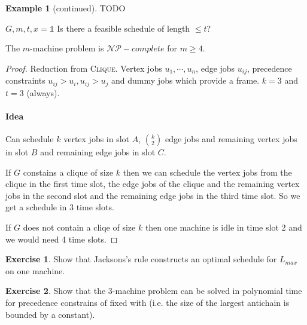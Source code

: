 \documentclass[11pt,a4paper,notitlepage]{article}
\providecommand{\NP}{\mathcal{NP}}
\theoremstyle{plain}
\theoremstyle{definition}
\newtheorem{example}[defn]{Example}
\newtheorem{exercise}{Exercise}
\begin{document}
\begin{example}[continued]
  TODO
\end{example}

\begin{problem}
  \quad
  \begin{algorithmic}
    \REQUIRE $G,m,t,x=\mathds{1}$
    \ENSURE Is there a feasible schedule of length $\leq t$?
  \end{algorithmic}
\end{problem}

\begin{theorem}
  The $m$-machine problem is $\NP-complete$ for $m\geq 4$.
\end{theorem}

\begin{proof}
  Reduction from \textsc{Clique}. Vertex jobs $u_{1},\cdots,u_{n}$, edge jobs
  $u_{ij}$, precedence constraints $u_{ij}>u_{i}, u_{ij}>u_{j}$ and dummy jobs
  which provide a frame. $k=3$ and $t=3$ (always).

  \paragraph{Idea} Can schedule $k$ vertex jobs in slot $A$, $k\choose 2$ edge
  jobs and remaining vertex jobs in slot $B$ and remaining edge jobs in slot
  $C$.


  If $G$ constains a clique of size $k$ then we can schedule the vertex jobs
  from the clique in the first time slot, the edge jobs of the clique and the
  remaining vertex jobs in the second slot and the remaining edge jobs in the
  third time slot. So we get a schedule in $3$ time slots.

  If $G$ does not contain a cliqe of size $k$ then one machine is idle in time
  slot 2 and we would need 4 time slots.
\end{proof}

\begin{exercise}
  Show that Jacksons's rule constructs an optimal schedule for $L_{max}$ on one
  machine.
\end{exercise}

\begin{exercise}
  Show that the 3-machine problem can be solved in polynomial time for
  precedence constrains of fixed with (i.e. the size of the largest antichain
  is bounded by a constant).
\end{exercise}


%

%
\end{document}
